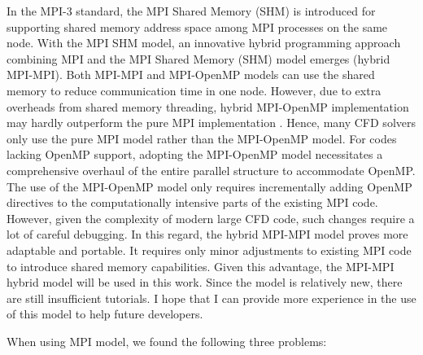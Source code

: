 In the MPI-3 standard, the MPI Shared Memory (SHM) \cite{brinskiy2017introduction} is introduced for supporting shared memory address space among MPI processes on the same node. With the MPI SHM model, an innovative hybrid programming approach combining MPI and the MPI Shared Memory (SHM) model emerges (hybrid MPI-MPI)\cite{hoefler2013mpi+}. Both MPI-MPI and MPI-OpenMP models can use the shared memory to reduce communication time in one node. However, due to extra overheads from shared memory threading, hybrid MPI-OpenMP implementation may hardly outperform the pure MPI implementation \cite{rabenseifner2009hybrid}. Hence, many CFD solvers only use the pure MPI model rather than the MPI-OpenMP model. For codes lacking OpenMP support, adopting the MPI-OpenMP model necessitates a comprehensive overhaul of the entire parallel structure to accommodate OpenMP. The use of the MPI-OpenMP model only requires incrementally adding OpenMP directives to the computationally intensive parts of the existing MPI code. However, given the complexity of modern large CFD code, such changes require a lot of careful debugging. In this regard, the hybrid MPI-MPI model proves more adaptable and portable.  It requires only minor adjustments to existing MPI code to introduce shared memory capabilities. Given this advantage, the MPI-MPI hybrid model will be used in this work. Since the model is relatively new, there are still insufficient tutorials. I hope that I can provide more experience in the use of this model to help future developers.

When using MPI model, we found the following three problems:




